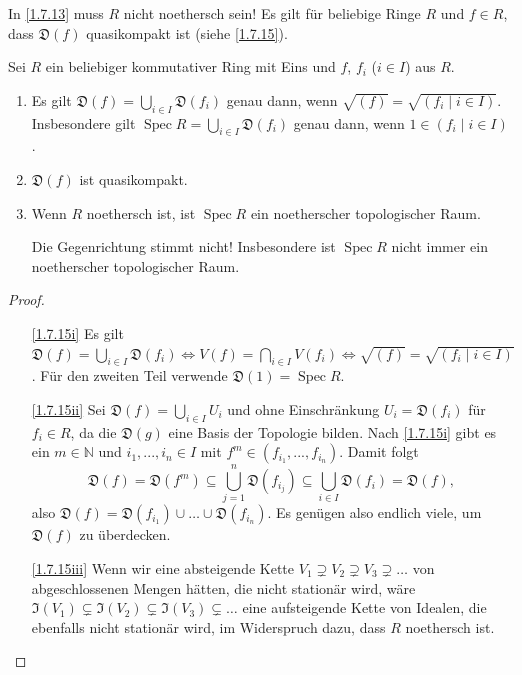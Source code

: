 \documentclass[a4paper,12pt]{scrbook}
\theoremstyle{keinenummern} %
\theoremstyle{mitnummern}
\theoremstyle{unserbeweis}
\newtheorem{proof}{Beweis}
\def\I{\mathfrak{I}}
\newcommand{\D}{\mathfrak{D}}
\newcommand{\Spec}{\operatorname{Spec}}
\renewcommand{\dotsc}{\ensuremath{\!...}}
\newcommand{\set}[1]{\ensuremath{\mathbb{#1}}}
\newcommand{\N}{\set{N}}
\begin{document}
\begin{bem*}
  In \cref{1.7.13} muss $R$ nicht noethersch sein! Es gilt für beliebige Ringe $R$ und $f\in R$, dass $\D(f)$ quasikompakt ist
  (siehe \cref{1.7.15}).
\end{bem*}

\begin{bem}\label{1.7.15}
  Sei $R$ ein beliebiger kommutativer Ring mit Eins und $f$, $f_i$ ($i\in I$) aus $R$.
  \begin{enumerate}
  \item{} Es gilt $\displaystyle \D(f)=\bigcup_{i\in I}\D(f_i)$ genau dann, wenn $\sqrt{(f)}=\sqrt{(f_i\mid i\in
      I)}$. Insbesondere gilt $\displaystyle\Spec R=\bigcup_{i\in I}\D(f_i)$ genau dann, wenn $1\in(f_i\mid i\in I)$.
  \item{} $\D(f)$ ist quasikompakt.
  \item{} Wenn $R$ noethersch ist, ist $\Spec R$ ein noetherscher topologischer Raum.
    \begin{w}
      Die Gegenrichtung stimmt nicht! Insbesondere ist $\Spec R$ nicht immer ein noetherscher topologischer Raum.
    \end{w}
  \end{enumerate}
\end{bem}
\begin{proof}
  \begin{enumerate}
  \item[\ref{1.7.15i}] Es gilt $\displaystyle \D(f)=\bigcup_{i\in I}\D(f_i) \iff V(f)=\bigcap_{i\in I}V(f_i) \iff
    \sqrt{(f)}=\sqrt{(f_i\mid i\in I)}$. Für den zweiten Teil verwende $\D(1)=\Spec R$.
  \item[\ref{1.7.15ii}] Sei $\D(f)=\bigcup_{i\in I} U_i$ und ohne Einschränkung $U_i=\D(f_i)$ für $f_i\in R$, da die $\D(g)$ eine
    Basis der Topologie bilden. Nach \ref{1.7.15i} gibt es ein $m\in\N$ und $i_1,\dotsc,i_n\in I$ mit
    $f^m\in(f_{i_1},\dotsc,f_{i_n})$. Damit folgt \[ \D(f)=\D(f^m)\subseteq\bigcup_{j=1}^n \D(f_{i_j}) \subseteq\bigcup_{i\in I}
    \D(f_i) = \D(f), \] also $\D(f)=\D(f_{i_1})\cup\dotso\cup \D(f_{i_n})$. Es genügen also endlich viele, um $\D(f)$ zu überdecken.
  \item[\ref{1.7.15iii}] Wenn wir eine absteigende Kette $V_1\supsetneq V_2\supsetneq V_3\supsetneq\dotso$ von abgeschlossenen
    Mengen hätten, die nicht stationär wird, wäre $\I(V_1)\subsetneq\I(V_2)\subsetneq\I(V_3)\subsetneq\dotso$ eine aufsteigende
    Kette von Idealen, die ebenfalls nicht stationär wird, im Widerspruch dazu, dass $R$ noethersch ist.
  \end{enumerate}
\end{proof}
\end{document}

